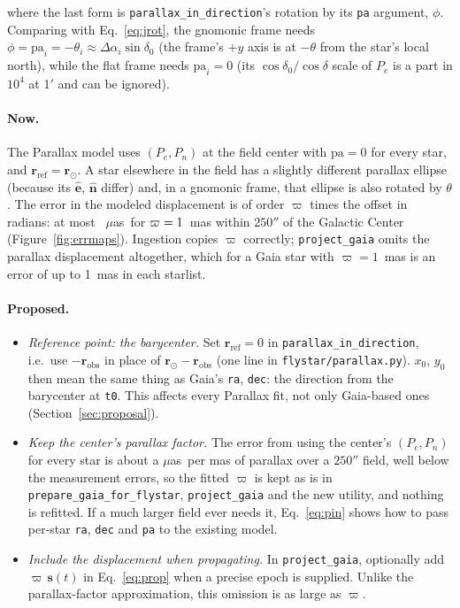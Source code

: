 \documentclass[11pt]{article}
\newcommand{\code}[1]{\texttt{#1}}
\newcommand{\muas}{$\mu$as}
\newcommand{\uvec}[1]{\hat{\mathbf #1}}
\begin{document}
where the last form is \code{parallax\_in\_direction}'s rotation by its
\code{pa} argument, $\phi$. Comparing with Eq.~\eqref{eq:jrot}, the
gnomonic frame needs $\phi = \mathrm{pa}_i = -\theta_i \approx \Delta\alpha_i\sin\delta_0$
(the frame's $+y$ axis is at $-\theta$ from the star's local north), while the
flat frame needs $\mathrm{pa}_i = 0$ (its $\cos\delta_0/\cos\delta$ scale of
$P_e$ is a part in $10^4$ at 1$'$ and can be ignored).

\paragraph{Now.} The Parallax model uses $(P_e,P_n)$ at the field center with
$\mathrm{pa}=0$ for every star, and $\mathbf r_\mathrm{ref} = \mathbf r_\odot$.
A star elsewhere in the field has a slightly different parallax ellipse
(because its $\uvec e$, $\uvec n$ differ) and, in a gnomonic frame, that
ellipse is also rotated by $\theta$. The error in the modeled displacement is
of order $\varpi$ times the offset in radians: at most \ErrMapPiMax~\muas\ for
$\varpi = 1$~mas within $250''$ of the Galactic Center
(Figure~\ref{fig:errmaps}). Ingestion copies $\varpi$ correctly;
\code{project\_gaia} omits the parallax displacement altogether, which for a
Gaia star with $\varpi = 1$~mas is an error of up to 1~mas in each starlist.

\paragraph{Proposed.}
\begin{itemize}
  \item \emph{Reference point: the barycenter.} Set
    $\mathbf r_\mathrm{ref} = 0$ in \code{parallax\_in\_direction}, i.e.\
    use $-\mathbf r_\mathrm{obs}$ in place of
    $\mathbf r_\odot - \mathbf r_\mathrm{obs}$ (one line in
    \code{flystar/parallax.py}). $x_0$, $y_0$ then mean the same thing as
    Gaia's \code{ra}, \code{dec}: the direction from the barycenter at
    \code{t0}. This affects every Parallax fit, not only Gaia-based ones
    (Section~\ref{sec:proposal}).
  \item \emph{Keep the center's parallax factor.} The error from using the
    center's $(P_e,P_n)$ for every star is about a \muas\ per mas of parallax
    over a $250''$ field, well below the measurement errors, so the fitted
    $\varpi$ is kept as is in \code{prepare\_gaia\_for\_flystar},
    \code{project\_gaia} and the new utility, and nothing is refitted. If a
    much larger field ever needs it, Eq.~\eqref{eq:pin} shows how to pass
    per-star \code{ra}, \code{dec} and \code{pa} to the existing model.
  \item \emph{Include the displacement when propagating.} In
    \code{project\_gaia}, optionally add $\varpi\,\mathbf s(t)$ in
    Eq.~\eqref{eq:prop} when a precise epoch is supplied. Unlike the
    parallax-factor approximation, this omission is as large as $\varpi$.
\end{itemize}
\end{document}
